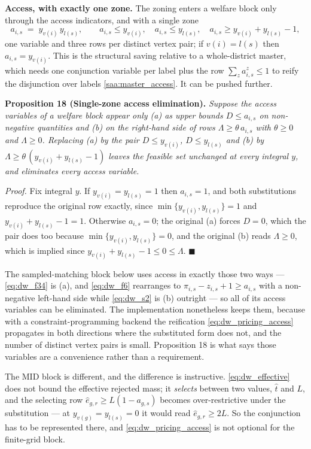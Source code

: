 \documentclass{article}
\begin{document}
\noindent\textbf{Access, with exactly one zone.}
The zoning enters a welfare block only through the access indicators, and with
a single zone
\begin{equation}\label{eq:dw_pricing_access}
a_{i,s} \;=\; y_{v(i)}\, y_{l(s)}, \qquad
a_{i,s}\leq y_{v(i)}, \quad a_{i,s}\leq y_{l(s)}, \quad
a_{i,s}\geq y_{v(i)}+y_{l(s)}-1 ,
\end{equation}
one variable and three rows per distinct vertex pair; if $v(i) = l(s)$ then
$a_{i,s} = y_{v(i)}$. This is the structural saving relative to a
whole-district master, which needs one conjunction variable per label plus the
row $\sum_z a^{z}_{i,s} \le 1$ to reify the disjunction over labels
\eqref{saa:master_access}. It can be pushed further.

\noindent\textbf{Proposition 18 (Single-zone access elimination).}
\textit{Suppose the access variables of a welfare block appear only (a) as upper
bounds $D \leq a_{i,s}$ on non-negative quantities and (b) on the right-hand
side of rows $\Lambda \geq \theta\, a_{i,s}$ with $\theta \geq 0$ and
$\Lambda \geq 0$. Replacing (a) by the pair $D \leq y_{v(i)}$,
$D \leq y_{l(s)}$ and (b) by
$\Lambda \geq \theta\,(y_{v(i)} + y_{l(s)} - 1)$ leaves the feasible set
unchanged at every integral $y$, and eliminates every access variable.}

\textit{Proof.} Fix integral $y$. If $y_{v(i)} = y_{l(s)} = 1$ then
$a_{i,s} = 1$, and both substitutions reproduce the original row exactly, since
$\min\{y_{v(i)}, y_{l(s)}\} = 1$ and $y_{v(i)} + y_{l(s)} - 1 = 1$. Otherwise
$a_{i,s} = 0$; the original (a) forces $D = 0$, which the pair does too because
$\min\{y_{v(i)}, y_{l(s)}\} = 0$, and the original (b) reads $\Lambda \geq 0$,
which is implied since $y_{v(i)} + y_{l(s)} - 1 \leq 0 \leq \Lambda$.
$\blacksquare$

The sampled-matching block below uses access in exactly those two ways ---
\eqref{eq:dw_f34} is (a), and \eqref{eq:dw_f6} rearranges to
$\pi_{i,s} - z_{i,s} + 1 \geq a_{i,s}$ with a non-negative left-hand side while
\eqref{eq:dw_s2} is (b) outright --- so all of its access variables can be
eliminated. The implementation nonetheless keeps them, because with a
constraint-programming backend the reification \eqref{eq:dw_pricing_access}
propagates in both directions where the substituted form does not, and the
number of distinct vertex pairs is small. Proposition 18 is what says those
variables are a convenience rather than a requirement.

The MID block is different, and the difference is instructive.
\eqref{eq:dw_effective} does not bound the effective rejected mass; it
\emph{selects} between two values, $\widehat t$ and $L$, and the selecting row
$\widehat e_{g,r} \geq L(1 - a_{g,s})$ becomes over-restrictive under the
substitution --- at $y_{v(g)} = y_{l(s)} = 0$ it would read
$\widehat e_{g,r} \geq 2L$. So the conjunction has to be represented there, and
\eqref{eq:dw_pricing_access} is not optional for the finite-grid block.
\end{document}

